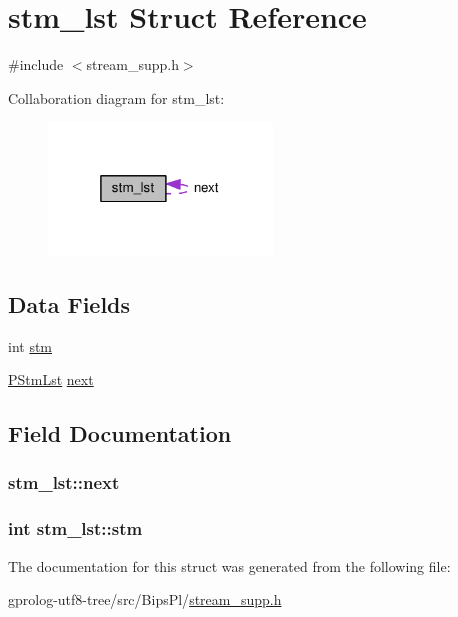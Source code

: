 \hypertarget{structstm__lst}{}\section{stm\+\_\+lst Struct Reference}
\label{structstm__lst}


{\ttfamily \#include $<$stream\+\_\+supp.\+h$>$}



Collaboration diagram for stm\+\_\+lst\+:\nopagebreak
\begin{figure}[H]
\begin{center}
\leavevmode
\includegraphics[width=169pt]{structstm__lst__coll__graph}
\end{center}
\end{figure}
\subsection*{Data Fields}
\begin{DoxyCompactItemize}
\item 
int \hyperlink{structstm__lst_a69932b67f84be652c1d4fab80820a4cc}{stm}
\item 
\hyperlink{stream__supp_8h_a6b553ae1ecc32ad49304cd836fb357c3}{P\+Stm\+Lst} \hyperlink{structstm__lst_aaecf8566184bb06365a7de2d3ba8312b}{next}
\end{DoxyCompactItemize}


\subsection{Field Documentation}
\subsubsection[{\texorpdfstring{next}{next}}]{ stm\+\_\+lst\+::next}\hypertarget{structstm__lst_aaecf8566184bb06365a7de2d3ba8312b}{}\label{structstm__lst_aaecf8566184bb06365a7de2d3ba8312b}
\subsubsection[{\texorpdfstring{stm}{stm}}]{\setlength{\rightskip}{0pt plus 5cm}int stm\+\_\+lst\+::stm}\hypertarget{structstm__lst_a69932b67f84be652c1d4fab80820a4cc}{}\label{structstm__lst_a69932b67f84be652c1d4fab80820a4cc}


The documentation for this struct was generated from the following file\+:\begin{DoxyCompactItemize}
\item 
gprolog-\/utf8-\/tree/src/\+Bips\+Pl/\hyperlink{stream__supp_8h}{stream\+\_\+supp.\+h}\end{DoxyCompactItemize}
